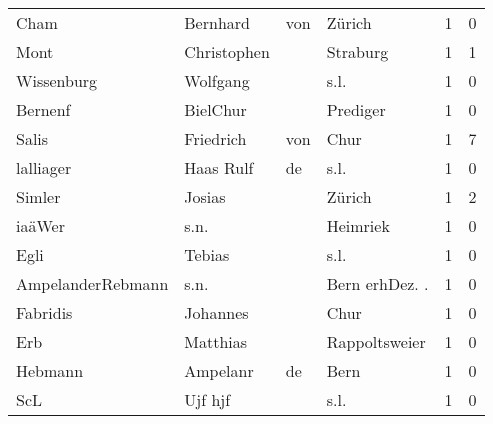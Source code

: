 \begin{tabular}{llllrr}
                     Cham &                           Bernhard &         von &                                      Zürich &          1 &         0 \\
                     Mont &                        Christophen &             &                                    Straburg &          1 &         1 \\
               Wissenburg &                           Wolfgang &             &                                        s.l. &          1 &         0 \\
                  Bernenf &                           BielChur &             &                                    Prediger &          1 &         0 \\
                    Salis &                          Friedrich &         von &                                        Chur &          1 &         7 \\
                lalliager &                          Haas Rulf &          de &                                        s.l. &          1 &         0 \\
                   Simler &                             Josias &             &                                      Zürich &          1 &         2 \\
                   iaäWer &                               s.n. &             &                                    Heimriek &          1 &         0 \\
                     Egli &                             Tebias &             &                                        s.l. &          1 &         0 \\
        AmpelanderRebmann &                               s.n. &             &                             Bern erhDez. .  &          1 &         0 \\
                 Fabridis &                           Johannes &             &                                        Chur &          1 &         0 \\
                      Erb &                           Matthias &             &                               Rappoltsweier &          1 &         0 \\
                  Hebmann &                           Ampelanr &          de &                                        Bern &          1 &         0 \\
                      ScL &                            Ujf hjf &             &                                        s.l. &          1 &         0 \\

\end{tabular}
